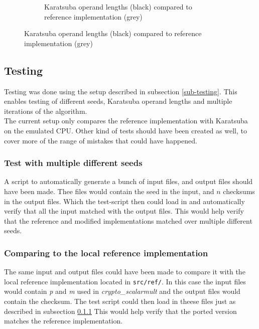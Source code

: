 \begin{figure}[H]
\begin{subfigure}{\textwidth}
    \centering
    \caption{Karatsuba operand lengths (black) compared to reference implementation (grey)}
\end{subfigure}
\label{karatsubacomparison}
\end{figure}


\subsection{Testing}
Testing was done using the setup described in subsection \ref{sub-testing}. This enables testing of different seeds, Karatsuba operand lengths and multiple iterations of the algorithm.
\\
The current setup only compares the reference implementation with Karatsuba on the emulated CPU. Other kind of tests should have been created as well, to cover more of the range of mistakes that could have happened.\\
\subsubsection{Test with multiple different seeds}
\label{missing-test-1}
A script to automatically generate a bunch of input files, and output files should have been made. Thee files would contain the seed in the input, and $n$ checksums in the output files. Which the test-script then could load in and automatically verify that all the input matched with the output files. This would help verify that the reference and modified implementations matched over multiple different seeds.

\subsubsection{Comparing to the local reference implementation}
The same input and output files could have been made to compare it with the local reference implementation located in \texttt{src/ref/}. In this case the input files would contain \textit{p} and \textit{m} used in \textit{crypto\_scalarmult} and the output files would contain the checksum. The test script could then load in theese files just as described in subsection \ref{missing-test-1} This would help verify that the ported version matches the reference implementation.